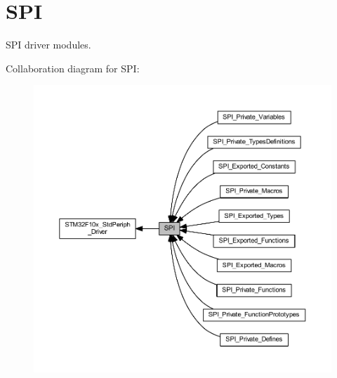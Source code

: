 \hypertarget{group___s_p_i}{}\section{S\+PI}
\label{group___s_p_i}


S\+PI driver modules.  


Collaboration diagram for S\+PI\+:
\nopagebreak
\begin{figure}[H]
\begin{center}
\leavevmode
\includegraphics[width=350pt]{group___s_p_i}
\end{center}
\end{figure}
